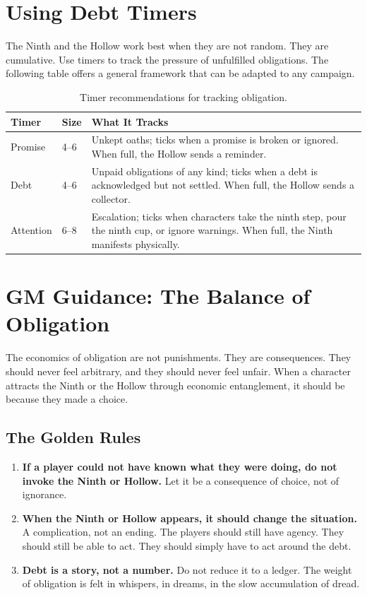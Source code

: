 \documentclass[12pt,oneside]{book}
\begin{document}
\section{Using Debt Timers}

The Ninth and the Hollow work best when they are not random. They are cumulative. Use timers to track the pressure of unfulfilled obligations. The following table offers a general framework that can be adapted to any campaign.

\begin{table}[h]
\centering
\begin{tabular}{|p{3cm}|p{2cm}|p{5cm}|}
\hline
\textbf{Timer} & \textbf{Size} & \textbf{What It Tracks} \\
\hline
Promise & 4--6 & Unkept oaths; ticks when a promise is broken or ignored. When full, the Hollow sends a reminder. \\
Debt & 4--6 & Unpaid obligations of any kind; ticks when a debt is acknowledged but not settled. When full, the Hollow sends a collector. \\
Attention & 6--8 & Escalation; ticks when characters take the ninth step, pour the ninth cup, or ignore warnings. When full, the Ninth manifests physically. \\
\hline
\end{tabular}
\caption{Timer recommendations for tracking obligation.}
\end{table}

\section{GM Guidance: The Balance of Obligation}

The economics of obligation are not punishments. They are consequences. They should never feel arbitrary, and they should never feel unfair. When a character attracts the Ninth or the Hollow through economic entanglement, it should be because they made a choice.

\subsection{The Golden Rules}

\begin{enumerate}
\item \textbf{If a player could not have known what they were doing, do not invoke the Ninth or Hollow.} Let it be a consequence of choice, not of ignorance.
\item \textbf{When the Ninth or Hollow appears, it should change the situation.} A complication, not an ending. The players should still have agency. They should still be able to act. They should simply have to act around the debt.
\item \textbf{Debt is a story, not a number.} Do not reduce it to a ledger. The weight of obligation is felt in whispers, in dreams, in the slow accumulation of dread.
\end{enumerate}
\end{document}
